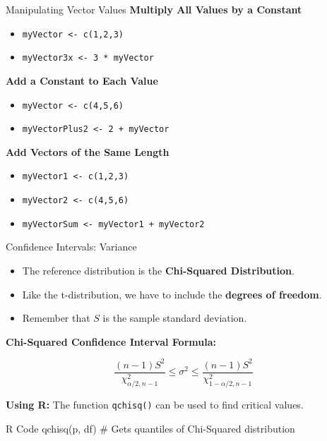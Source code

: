 \documentclass{beamer}
\begin{document}
\begin{frame}{Manipulating Vector Values}
    \textbf{Multiply All Values by a Constant}
    \begin{itemize}
        \item \texttt{myVector <- c(1,2,3)}
        \item \texttt{myVector3x <- 3 * myVector}
    \end{itemize}

    \textbf{Add a Constant to Each Value}
    \begin{itemize}
        \item \texttt{myVector <- c(4,5,6)}
        \item \texttt{myVectorPlus2 <- 2 + myVector}
    \end{itemize}

    \textbf{Add Vectors of the Same Length}
    \begin{itemize}
        \item \texttt{myVector1 <- c(1,2,3)}
        \item \texttt{myVector2 <- c(4,5,6)}
        \item \texttt{myVectorSum <- myVector1 + myVector2}
    \end{itemize}
\end{frame}

\begin{frame}{Confidence Intervals: Variance}
    \begin{itemize}
        \item The reference distribution is the \textbf{Chi-Squared Distribution}.
        \item Like the t-distribution, we have to include the \textbf{degrees of freedom}.
        \item Remember that \( S \) is the sample standard deviation.
    \end{itemize}

    \vspace{0.5cm}
    \textbf{Chi-Squared Confidence Interval Formula:}

    \[
    \frac{(n - 1) S^2}{\chi^2_{\alpha/2, n-1}} \leq \sigma^2 \leq \frac{(n - 1) S^2}{\chi^2_{1-\alpha/2, n-1}}
    \]

    \vspace{0.3cm}
    \textbf{Using R:} The function \texttt{qchisq()} can be used to find critical values.

    \begin{block}{R Code}
qchisq(p, df)  # Gets quantiles of Chi-Squared distribution
    \end{block}
\end{frame}
\end{document}
